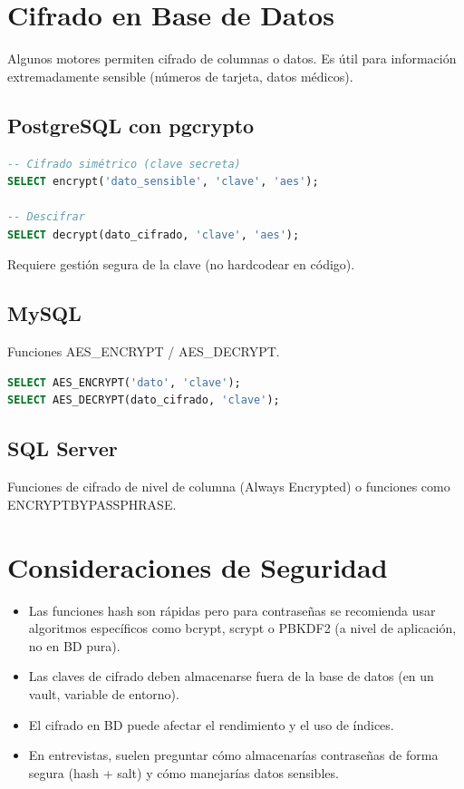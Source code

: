 \documentclass[12pt,a4paper,openany,oneside]{book}
\begin{document}
\section{Cifrado en Base de Datos}
Algunos motores permiten cifrado de columnas o datos. Es útil para información extremadamente sensible (números de tarjeta, datos médicos).

\subsection{PostgreSQL con pgcrypto}
\begin{lstlisting}[language=SQL]
-- Cifrado simétrico (clave secreta)
SELECT encrypt('dato_sensible', 'clave', 'aes');

-- Descifrar
SELECT decrypt(dato_cifrado, 'clave', 'aes');
\end{lstlisting}
Requiere gestión segura de la clave (no hardcodear en código).

\subsection{MySQL}
Funciones AES\_ENCRYPT / AES\_DECRYPT.
\begin{lstlisting}[language=SQL]
SELECT AES_ENCRYPT('dato', 'clave');
SELECT AES_DECRYPT(dato_cifrado, 'clave');
\end{lstlisting}

\subsection{SQL Server}
Funciones de cifrado de nivel de columna (Always Encrypted) o funciones como ENCRYPTBYPASSPHRASE.

\section{Consideraciones de Seguridad}
\begin{itemize}
    \item Las funciones hash son rápidas pero para contraseñas se recomienda usar algoritmos específicos como bcrypt, scrypt o PBKDF2 (a nivel de aplicación, no en BD pura).
    \item Las claves de cifrado deben almacenarse fuera de la base de datos (en un vault, variable de entorno).
    \item El cifrado en BD puede afectar el rendimiento y el uso de índices.
    \item En entrevistas, suelen preguntar cómo almacenarías contraseñas de forma segura (hash + salt) y cómo manejarías datos sensibles.
\end{itemize}
\end{document}

